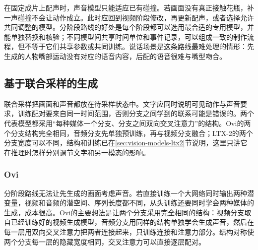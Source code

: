 在固定成片上配声时，声音模型只能适应已有碰撞。若画面没有真正接触花瓶，补一声碰撞不会让动作成立。此时应回到视频阶段修改，再更新配声，或者选择允许共同调整的模型。分阶段路线的好处是每个阶段都可以选用最合适的专用模型，并能单独替换和核验；不同模型间共享时间单位和事件记录，可以组成一致的制作流程，但不等于它们共享参数或共同训练。说话场景是这条路线最难处理的情形：先生成的人物嘴部运动没有对应的语音内容，后配的语音很难与嘴型吻合。

\subsection{基于联合采样的生成}
\label{sec:vision-multigen-joint-mechanism}

联合采样把画面和声音都放在待采样状态中。文字应同时说明可见动作与声音要求，训练配对要来自同一时间范围，否则分支之间学到的联系可能是错误的。两个代表模型都采用“每种媒体一个分支、分支之间双向交叉注意力”的结构。Ovi的两个分支结构完全相同，音频分支先单独预训练，再与视频分支融合；LTX-2的两个分支宽度可以不同，结构和训练已在\ref{sec:vision-models-ltx2}节说明，这里只讲它在推理时怎样分别调节文字和另一模态的影响。

\subsubsection{Ovi}
\label{sec:vision-multigen-ovi}

分阶段路线无法让先生成的画面考虑声音。若直接训练一个大网络同时输出两种潜变量，视频和音频的潜空间、序列长度都不同，从头训练还要同时学会两种媒体的生成，成本很高。Ovi的主要想法是让两个分支采用完全相同的结构：视频分支取自已经训练好的视频生成模型，音频分支用同样的结构单独学会生成声音，然后在每一层用双向交叉注意力把两者连接起来，只训练连接和注意力部分。结构对称使两个分支每一层的隐藏宽度相同，交叉注意力可以直接逐层配对。

